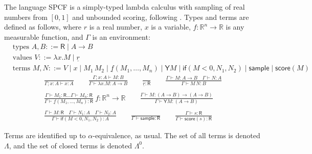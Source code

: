 \documentclass{article}
\newcommand{\tY}{\mathsf{Y}}
\newcommand{\tif}[3]{\mathsf{if}(#1, #2, #3)} %
\newcommand{\tsample}{\mathsf{sample}}
\newcommand{\tscore}{\mathsf{score}}
\theoremstyle{definition}
\theoremstyle{lemma}
\theoremstyle{remark}
\begin{document}
The language SPCF is a simply-typed lambda calculus with sampling of real numbers from $[0,1]$ and unbounded scoring, following \cite{MakOP20b}. Types and terms are defined as follows, where $r$ is a real number, $x$ is a variable, $f : \mathbb{R}^n \to \mathbb{R}$ is any measurable function, and $\Gamma$ is an environment:
\begin{align*}
  & \text{types } A, B ::= \textsf{R}  \mid  A \to B \\
  & \text{values } V ::= \lambda x.M  \mid  \underline{r} \\
  & \text{terms } M, N ::= V  \mid  x  \mid  M_1 \, M_2  \mid  \underline{f}(M_1,\dots ,M_n)  \mid  \tY M  \mid  \tif{M < 0}{N_1}{N_2}  \mid  \tsample  \mid  \tscore(M)
\end{align*}
\begin{align*}
  \frac{}{\Gamma ; x:A \vdash x:A} \qquad
  \frac{\Gamma ; x:A \vdash M : B}{\Gamma \vdash \lambda x.M : A \to B} \qquad
  \frac{}{\underline{r} : \textsf{R}} \qquad
  \frac{\Gamma \vdash M:A \to B \quad \Gamma \vdash N : A}{\Gamma \vdash M \, N : B} \\ \\
  \frac{\Gamma \vdash M_1:\textsf{R} \dots \Gamma \vdash M_n:\textsf{R}}{\Gamma \vdash \underline{f}(M_1,\dots,M_n) : \textsf{R}} \ f : \mathbb{R}^n \to \mathbb{R} \qquad
  \frac{\Gamma \vdash M : (A \to B) \to (A \to B)}{\Gamma \vdash \tY M : (A \to B)} \\ \\
  \frac{\Gamma \vdash M : \textsf{R} \quad \Gamma \vdash N_1 : A \quad \Gamma \vdash N_2 : A}{\Gamma \vdash \tif{M < 0}{N_1}{N_2} : A} \qquad
  \frac{}{\Gamma \vdash \tsample : \textsf{R}} \qquad
  \frac{\Gamma \vdash s : \textsf{R}}{\Gamma \vdash \tscore (s) : \textsf{R}}
\end{align*}

Terms are identified up to $\alpha$-equivalence, as usual. The set of all terms is denoted $\Lambda$, and the set of closed terms is denoted $\Lambda^0$.
\end{document}
